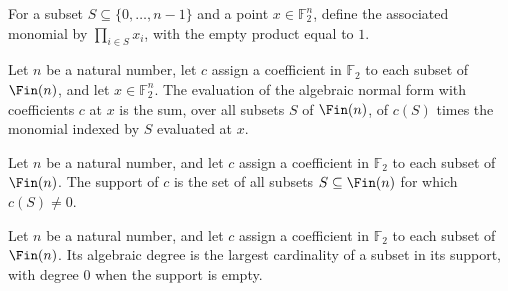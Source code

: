 \begin{definition}
\label{FABL.anfMonomial}
\leanok
{}
For a subset $S\subseteq\{0,\ldots,n-1\}$ and a point $x\in\mathbb F_2^n$, define the
associated monomial by $\prod_{i\in S}x_i$, with the empty product equal to $1$.
\end{definition}

\begin{definition}
\label{FABL.anfEval}
\leanok
{}
Let $n$ be a natural number, let $c$ assign a coefficient in $\mathbb{F}_2$ to each subset of
$\Fin(n)$, and let $x \in \mathbb{F}_2^n$. The evaluation of the algebraic normal form with
coefficients $c$ at $x$ is the sum, over all subsets $S$ of $\Fin(n)$, of $c(S)$ times the
monomial indexed by $S$ evaluated at $x$.
\end{definition}

\begin{definition}
\label{FABL.anfSupport}
\leanok
{}
Let $n$ be a natural number, and let $c$ assign a coefficient in $\mathbb{F}_2$ to each subset of
$\Fin(n)$. The support of $c$ is the set of all subsets $S \subseteq \Fin(n)$ for which $c(S)
\ne 0$.
\end{definition}

\begin{definition}
\label{FABL.algebraicDegree}
\leanok
{}
Let $n$ be a natural number, and let $c$ assign a coefficient in $\mathbb{F}_2$ to each subset of
$\Fin(n)$. Its algebraic degree is the largest cardinality of a subset in its support, with
degree $0$ when the support is empty.
\end{definition}

